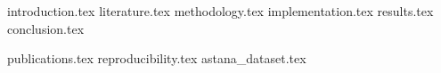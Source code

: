 \documentclass[a4paper,12pt,oneside,openbib,oldfontcommands]{memoir}
\newcommand{\clearemptydoublepage}{\newpage{\thispagestyle{empty}\cleardoublepage}}
\theoremstyle{plain}
\theoremstyle{definition}
\theoremstyle{plain}
\begin{document}
\frontmatter
{}



\clearemptydoublepage


\clearemptydoublepage

\cleardoublepage
{}
\listoftables
\cleardoublepage
{}
\listoffigures
\cleardoublepage

\renewcommand{\contentsname}{Table of Contents}
\tableofcontents
\cleardoublepage

\mainmatter
{introduction.tex}
{literature.tex}
{methodology.tex}
{implementation.tex}
{results.tex}
{conclusion.tex}

\appendix
{publications.tex}
{reproducibility.tex}
{astana_dataset.tex}

\backmatter


\clearemptydoublepage
\end{document}
